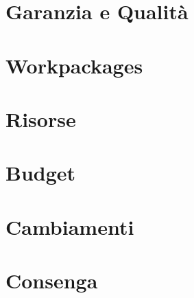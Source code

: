 \chapter{Garanzia e Qualità}

\chapter{Workpackages}

\chapter{Risorse}

\chapter{Budget}

\chapter{Cambiamenti}

\chapter{Consenga}



